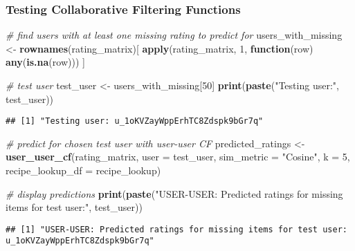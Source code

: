 \documentclass[
]{article}
\newenvironment{Shaded}{\begin{snugshade}}{\end{snugshade}}
\newcommand{\AttributeTok}[1]{\textcolor[rgb]{0.13,0.29,0.53}{#1}}
\newcommand{\CommentTok}[1]{\textcolor[rgb]{0.56,0.35,0.01}{\textit{#1}}}
\newcommand{\ControlFlowTok}[1]{\textcolor[rgb]{0.13,0.29,0.53}{\textbf{#1}}}
\newcommand{\DecValTok}[1]{\textcolor[rgb]{0.00,0.00,0.81}{#1}}
\newcommand{\FunctionTok}[1]{\textcolor[rgb]{0.13,0.29,0.53}{\textbf{#1}}}
\newcommand{\NormalTok}[1]{#1}
\newcommand{\OtherTok}[1]{\textcolor[rgb]{0.56,0.35,0.01}{#1}}
\newcommand{\StringTok}[1]{\textcolor[rgb]{0.31,0.60,0.02}{#1}}
\begin{document}
\subsubsection{Testing Collaborative Filtering
Functions}\label{testing-collaborative-filtering-functions}

\begin{Shaded}
\begin{Highlighting}[]
\CommentTok{\# find users with at least one missing rating to predict for}
\NormalTok{users\_with\_missing }\OtherTok{\textless{}{-}} \FunctionTok{rownames}\NormalTok{(rating\_matrix)[}
  \FunctionTok{apply}\NormalTok{(rating\_matrix, }\DecValTok{1}\NormalTok{, }\ControlFlowTok{function}\NormalTok{(row) }\FunctionTok{any}\NormalTok{(}\FunctionTok{is.na}\NormalTok{(row)))}
\NormalTok{]}

\CommentTok{\# test user}
\NormalTok{test\_user }\OtherTok{\textless{}{-}}\NormalTok{ users\_with\_missing[}\DecValTok{50}\NormalTok{]}
\FunctionTok{print}\NormalTok{(}\FunctionTok{paste}\NormalTok{(}\StringTok{"Testing user:"}\NormalTok{, test\_user))}
\end{Highlighting}
\end{Shaded}

\begin{verbatim}
## [1] "Testing user: u_1oKVZayWppErhTC8Zdspk9bGr7q"
\end{verbatim}

\begin{Shaded}
\begin{Highlighting}[]
\CommentTok{\# predict for chosen test user with user{-}user CF}
\NormalTok{predicted\_ratings }\OtherTok{\textless{}{-}} \FunctionTok{user\_user\_cf}\NormalTok{(rating\_matrix, }\AttributeTok{user =}\NormalTok{ test\_user, }
                                  \AttributeTok{sim\_metric =} \StringTok{"Cosine"}\NormalTok{, }\AttributeTok{k =} \DecValTok{5}\NormalTok{, }
                                  \AttributeTok{recipe\_lookup\_df =}\NormalTok{ recipe\_lookup)}

\CommentTok{\# display predictions}
\FunctionTok{print}\NormalTok{(}\FunctionTok{paste}\NormalTok{(}\StringTok{"USER{-}USER: Predicted ratings for missing items for test user:"}\NormalTok{, test\_user))}
\end{Highlighting}
\end{Shaded}

\begin{verbatim}
## [1] "USER-USER: Predicted ratings for missing items for test user: u_1oKVZayWppErhTC8Zdspk9bGr7q"
\end{verbatim}
\end{document}
